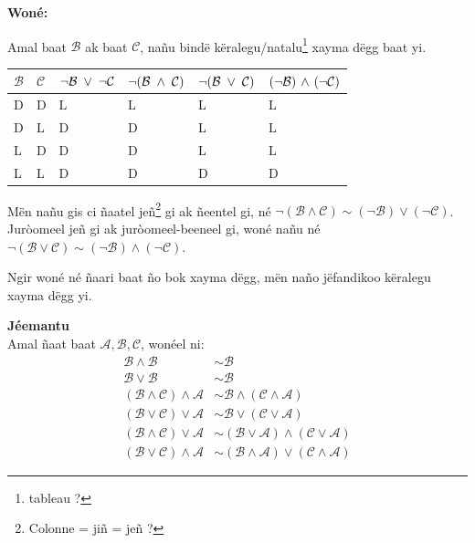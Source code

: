 \documentclass[twoside, a4paper]{article}
\begin{document}
\textbf{Woné:}

Amal baat $\mathcal{B}$ ak baat $\mathcal{C}$, nañu bindë këralegu/natalu\footnote{tableau ?} xayma dëgg baat yi.\\

\begin{tabularx}{0.8\textwidth} { 
  | >{\centering\arraybackslash}X 
  | >{\centering\arraybackslash}X 
  | >{\centering\arraybackslash}X 
  | >{\centering\arraybackslash}X 
  | >{\centering\arraybackslash}X 
  | >{\centering\arraybackslash}X |}
 \hline
$\mathcal{B}$& $\mathcal{C}$ & $\neg\mathcal{B}\hspace{0.1cm}\lor\hspace{0.1cm}\neg\mathcal{C}$ & $\neg(\mathcal{B}\hspace{0.1cm}\land\hspace{0.1cm}\mathcal{C})$&$\neg(\mathcal{B}\hspace{0.1cm}\lor\hspace{0.1cm}\mathcal{C})$&$(\neg\mathcal{B})\hspace{0.05cm}\land\hspace{0.05cm}(\neg\mathcal{C})$\\
 \hline
 D  & D & L & L & L & L\\
 D  & L & D & D & L & L\\
 L  & D & D & D & L & L\\
 L  & L & D & D & D & D\\
\hline
\end{tabularx}
Mën nañu gis ci ñaatel jeñ\footnote{Colonne = jiñ = jeñ ?} gi ak ñeentel gi, né $\neg(\mathcal{B} \land \mathcal{C}) \sim (\neg\mathcal{B}) \lor (\neg \mathcal{C})$. Juròomeel jeñ gi ak juròomeel-beeneel gi, woné nañu né $\neg(\mathcal{B} \lor \mathcal{C})\sim (\neg\mathcal{B}) \land (\neg \mathcal{C})$.


\begin{tcolorbox}[enhanced jigsaw,breakable,pad at break*=1mm, colback=green!5!white,colframe=white!75!black,title= Tègtal\footnote{Indication ?},
  watermark color=white]
Ngir woné né ñaari baat ño bok xayma dëgg, mën naño jëfandikoo këralegu xayma dëgg yi.
\end{tcolorbox}

\textbf{Jéemantu}\\
Amal ñaat baat $\mathcal{A}, \mathcal{B}, \mathcal{C}$, wonéel ni: 
\begin{align*}
    \mathcal{B} \land \mathcal{B} &\sim \mathcal{B} \\
    \mathcal{B} \lor \mathcal{B} &\sim \mathcal{B} \\
    (\mathcal{B} \land \mathcal{C}) \land \mathcal{A} &\sim \mathcal{B} \land (\mathcal{C} \land \mathcal{A}) \\
    (\mathcal{B} \lor \mathcal{C}) \lor \mathcal{A} &\sim \mathcal{B} \lor (\mathcal{C} \lor \mathcal{A}) \\
    (\mathcal{B} \land \mathcal{C}) \lor \mathcal{A} &\sim (\mathcal{B} \lor \mathcal{A}) \land (\mathcal{C} \lor \mathcal{A})\\
    (\mathcal{B} \lor \mathcal{C}) \land \mathcal{A} &\sim (\mathcal{B} \land \mathcal{A}) \lor (\mathcal{C} \land \mathcal{A})
\end{align*}
\end{document}
